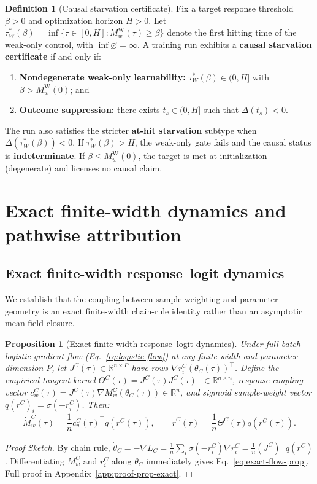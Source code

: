 \documentclass{article}
\newtheorem{proposition}{Proposition}
\theoremstyle{definition}
\newtheorem{definition}{Definition}
\theoremstyle{remark}
\newcommand{\R}{\mathbb{R}}
\newcommand{\sigm}{\sigma}
\newcommand{\Wcond}{\mathrm{W}}
\begin{document}
\begin{definition}[Causal starvation certificate]
\label{def:causal-starvation}
Fix a target response threshold $\beta > 0$ and optimization horizon $H > 0$. Let $\tau_W^*(\beta) = \inf\{\tau \in [0, H] : M_w^{\Wcond}(\tau) \ge \beta\}$ denote the first hitting time of the weak-only control, with $\inf \varnothing = \infty$.
A training run exhibits a \textbf{causal starvation certificate} if and only if:
\begin{enumerate}[leftmargin=*]
  \item \textbf{Nondegenerate weak-only learnability:} $\tau_W^*(\beta) \in (0, H]$ with $\beta > M_w^{\Wcond}(0)$; and
  \item \textbf{Outcome suppression:} there exists $t_s\in(0,H]$ such that $\Delta(t_s)<0$.
\end{enumerate}
The run also satisfies the stricter \textbf{at-hit starvation} subtype when $\Delta(\tau_W^*(\beta))<0$. If $\tau_W^*(\beta) > H$, the weak-only gate fails and the causal status is \textbf{indeterminate}. If $\beta \le M_w^{\Wcond}(0)$, the target is met at initialization (degenerate) and licenses no causal claim.
\end{definition}

\section{Exact finite-width dynamics and pathwise attribution}
\subsection{Exact finite-width response--logit dynamics}
We establish that the coupling between sample weighting and parameter geometry is an exact finite-width chain-rule identity rather than an asymptotic mean-field closure.

\begin{proposition}[Exact finite-width response--logit dynamics]
\label{prop:exact-dynamics}
Under full-batch logistic gradient flow (Eq.~\ref{eq:logistic-flow}) at any finite width and parameter dimension $P$, let $J^C(\tau) \in \R^{n \times P}$ have rows $\nabla r_i^C(\theta_C(\tau))^\top$. Define the empirical tangent kernel $\Theta^C(\tau) = J^C(\tau) J^C(\tau)^\top \in \R^{n \times n}$, response-coupling vector $c_w^C(\tau) = J^C(\tau) \nabla M_w^C(\theta_C(\tau)) \in \R^n$, and sigmoid sample-weight vector $q(r^C)_i = \sigm(-r_i^C)$. Then:
\begin{equation}
  \dot{M}_w^C(\tau) = \frac{1}{n} c_w^C(\tau)^\top q(r^C(\tau)), \qquad \dot{r}^C(\tau) = \frac{1}{n} \Theta^C(\tau) q(r^C(\tau)).
  \label{eq:exact-flow-prop}
\end{equation}
\end{proposition}
\begin{proof}[Proof Sketch]
By chain rule, $\dot{\theta}_C = -\nabla L_C = \frac{1}{n} \sum_i \sigma(-r_i^C) \nabla r_i^C = \frac{1}{n} (J^C)^\top q(r^C)$. Differentiating $M_w^C$ and $r_i^C$ along $\dot{\theta}_C$ immediately gives Eq.~\eqref{eq:exact-flow-prop}. Full proof in Appendix~\ref{app:proof-prop-exact}.
\end{proof}
\end{document}

